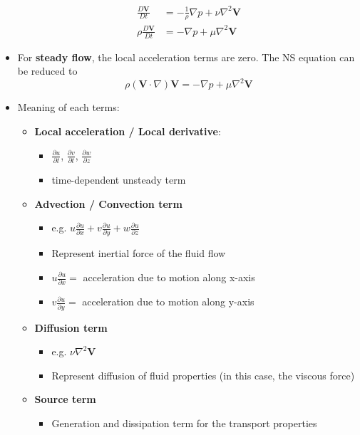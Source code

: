 \begin{itemize}
\begin{align*}
        \frac{D\bm{V}}{Dt} &= -\frac{1}{\rho} \nabla p + \nu \nabla^2 \bm{V}\\
        \rho \frac{D\bm{V}}{Dt} &= - \nabla p + \mu \nabla^2 \bm{V}
    \end{align*}
    \item For \textbf{\color{orange}steady flow}, the local acceleration terms are zero. The NS equation can be reduced to
    \begin{equation*}
        \rho (\bm{V}\cdot \nabla)\bm{V} = -\nabla p + \mu \nabla^2 \bm{V}
    \end{equation*}
    \item Meaning of each terms:
    \begin{itemize}
        \item \textbf{\color{red}Local acceleration / Local derivative}: 
        \begin{itemize}
            \item $\frac{\partial u}{\partial t}$, $\frac{\partial v}{\partial t}$, $\frac{\partial w}{\partial z}$
            \item time-dependent unsteady term
        \end{itemize}
        \item \textbf{\color{teal}Advection / Convection term}
        \begin{itemize}
            \item e.g. $u \frac{\partial u}{\partial x} + v \frac{\partial u}{\partial y} + w \frac{\partial u}{\partial z}$
            \item Represent inertial force of the fluid flow
            \item $u \frac{\partial u}{\partial x} = $ acceleration due to motion along x-axis
            \item $v \frac{\partial u}{\partial y} = $ acceleration due to motion along y-axis
        \end{itemize}
        \item \textbf{\color{blue}Diffusion term}
        \begin{itemize}
            \item e.g. $\nu \nabla^2 \bm{V}$
            \item Represent diffusion of fluid properties (in this case, the viscous force)
        \end{itemize}
        \item \textbf{\color{olive}Source term}
        \begin{itemize}
            \item Generation and dissipation term for the transport properties

\end{itemize}
\end{itemize}
\end{itemize}
